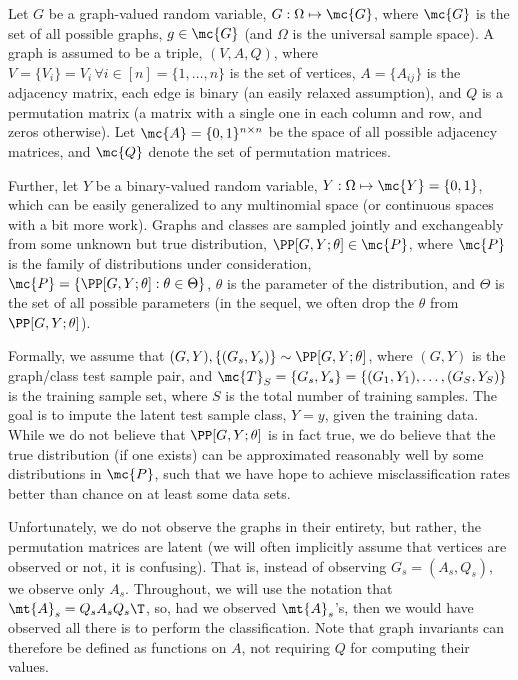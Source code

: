 
Let $G$ be a graph-valued random variable, $G: \Omega \mapsto \mc{G}$, where $\mc{G}$ is the set of all possible graphs, $g \in \mc{G}$ (and $\Omega$ is the universal sample space). A graph is assumed to be a triple, $(V,A,Q)$, where $V=\{V_i\}=V_i \, \forall i \in [n]=\{1,\ldots,n\}$ is the set of vertices, $A=\{A_{ij}\}$ is the adjacency matrix, each edge is binary (an easily relaxed assumption), and $Q$ is a permutation matrix (a matrix with a single one in each column and row, and zeros otherwise). Let $\mc{A}=\{0,1\}^{n \times n}$ be the space of all possible adjacency matrices, and $\mc{Q}$ denote the set of permutation matrices.

Further, let $Y$ be a binary-valued random variable, $Y: \Omega \mapsto \mc{Y} = \{0,1\}$, which can be easily generalized to any multinomial space (or continuous spaces with a bit more work).  Graphs and classes are sampled jointly and exchangeably from some unknown but true distribution, $\PP[G,Y; \theta] \in \mc{P}$, where $\mc{P}$ is the family of distributions under consideration, $\mc{P} = \{\PP[G,Y; \theta] : \theta \in \Theta\}$, $\theta$ is the parameter of the distribution, and $\Theta$ is the set of all possible parameters (in the sequel, we often drop the $\theta$ from $\PP[G,Y; \theta]$).  

Formally, we assume that  $(G,Y), \{(G_s,Y_s)\} \sim \PP[G,Y; \theta]$, where $(G,Y)$ is the graph/class test sample pair, and $\mc{T}_S=\{G_s,Y_s\}=\{(G_1,Y_1),\ldots, (G_S,Y_S)\}$ is the training sample set, where $S$ is the total number of training samples.  The goal is to impute the latent test sample class, $Y=y$, given the training data.  While we do not believe that $\PP[G,Y; \theta]$ is in fact true, we do believe that the true distribution (if one exists) can be approximated reasonably well by some distributions in $\mc{P}$, such that we have hope to achieve misclassification rates better than chance on at least some data sets.  

Unfortunately, we do not observe the graphs in their entirety, but rather, the permutation matrices are latent (we will often implicitly assume that vertices are observed or not, it is confusing).  That is, instead of observing $G_s=(A_s,Q_s)$, we observe only $A_s$.  Throughout, we will use the notation that $\mt{A}_s = Q_s A_s Q_s\T$, so, had we observed $\mt{A}_s$'s, then we would have observed all there is to perform the classification.  Note that graph invariants can therefore be defined as functions on $A$, not requiring $Q$ for computing their values.


